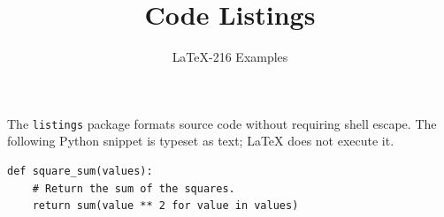 \documentclass{article}
\title{Code Listings}
\author{LaTeX-216 Examples}
\date{}
\begin{document}
\maketitle

The \texttt{listings} package formats source code without requiring shell
escape. The following Python snippet is typeset as text; LaTeX does not execute
it.
\begin{lstlisting}
def square_sum(values):
    # Return the sum of the squares.
    return sum(value ** 2 for value in values)
\end{lstlisting}
\end{document}
